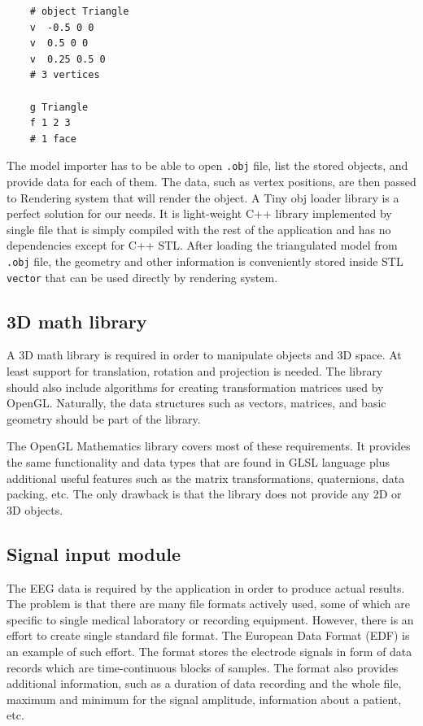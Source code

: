 \lstset{captionpos=b, caption=The .obj file example, label=lst:ObjFile}
\begin{lstlisting}
	# object Triangle
	v  -0.5 0 0
	v  0.5 0 0
	v  0.25 0.5 0
	# 3 vertices
	
	g Triangle
	f 1 2 3 
	# 1 face
\end{lstlisting}

The model importer has to be able to open \texttt{.obj} file, list the stored objects, and provide data for each of them. The data, such as vertex positions, are then passed to Rendering system that will render the object. A Tiny obj loader library is a perfect solution for our needs. It is light-weight C++ library implemented by single file that is simply compiled with the rest of the application and has no dependencies except for C++ STL. After loading the triangulated model from \texttt{.obj} file, the geometry and other information is conveniently stored inside STL \texttt{vector} that can be used directly by rendering system.

\subsection{3D math library}
A 3D math library is required in order to manipulate objects and 3D space. At least support for translation, rotation and projection is needed. The library should also include algorithms for creating transformation matrices used by OpenGL. Naturally, the data structures such as vectors, matrices, and basic geometry should be part of the library.

The OpenGL Mathematics library covers most of these requirements. It provides the same functionality and data types that are found in GLSL language plus additional useful features such as the matrix transformations, quaternions, data packing, etc. The only drawback is that the library does not provide any 2D or 3D objects.

\subsection{Signal input module}
The EEG data is required by the application in order to produce actual results. The problem is that there are many file formats actively used, some of which are specific to single medical laboratory or recording equipment. However, there is an effort to create single standard file format. The European Data Format (EDF) is an example of such effort. The format stores the electrode signals in form of data records which are time-continuous blocks of samples. The format also provides additional information, such as a duration of data recording and the whole file, maximum and minimum for the signal amplitude, information about a patient, etc. 

